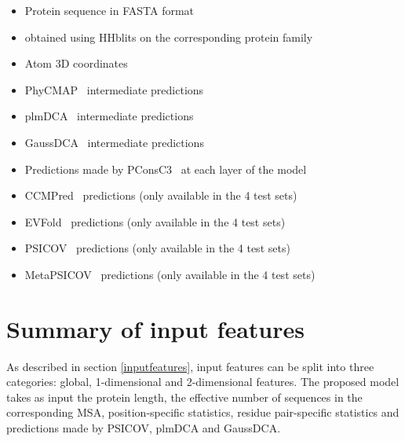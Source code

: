     \begin{itemize}
      \item Protein sequence in FASTA format
      \item {} obtained using HHblits on the corresponding protein family
      \item Atom 3D coordinates
      \item PhyCMAP~\cite{PhyCMap} intermediate predictions
      \item plmDCA~\cite{EKEBERG2014341} intermediate predictions
      \item GaussDCA~\cite{10.1371/journal.pone.0092721} intermediate predictions
      \item Predictions made by PConsC3~\cite{Skwark079673} at each layer of the model
      \item CCMPred~\cite{CCMPred} predictions (only available in the 4 test sets)
      \item EVFold~\cite{Sheridan021022} predictions (only available in the 4 test sets)
      \item PSICOV~\cite{doi:10.1093/bioinformatics/btr638} predictions (only available in the 4 test sets)
      \item MetaPSICOV~\cite{MetaPSICOV} predictions (only available in the 4 test sets)
    \end{itemize}



\section{Summary of input features}

  As described in section \ref{inputfeatures}, input features can be split into three categories:
  global, 1-dimensional and 2-dimensional features.
  The proposed model takes as input the protein length, the effective number of sequences 
  in the corresponding MSA, position-specific statistics, residue pair-specific statistics
  and predictions made by PSICOV, plmDCA and GaussDCA.

